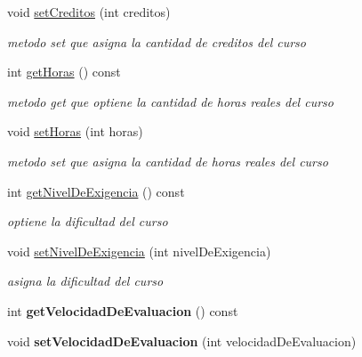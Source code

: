 \begin{DoxyCompactItemize}
void \hyperlink{classCursos_a2956a50ad53e77dc4fcb8c3190d8d071}{set\+Creditos} (int creditos)
\begin{DoxyCompactList}\small\item\em metodo set que asigna la cantidad de creditos del curso \end{DoxyCompactList}\item 
\mbox{\label{classCursos_aa4cdfed1f2684de2e761548d1210e281}} 
int \hyperlink{classCursos_aa4cdfed1f2684de2e761548d1210e281}{get\+Horas} () const
\begin{DoxyCompactList}\small\item\em metodo get que optiene la cantidad de horas reales del curso \end{DoxyCompactList}\item 
\mbox{\label{classCursos_a1c4074ee6a82de1459f1fd31aca8afeb}} 
void \hyperlink{classCursos_a1c4074ee6a82de1459f1fd31aca8afeb}{set\+Horas} (int horas)
\begin{DoxyCompactList}\small\item\em metodo set que asigna la cantidad de horas reales del curso \end{DoxyCompactList}\item 
int \hyperlink{classCursos_af0bb720b647b2ddb8cc1d270d470de92}{get\+Nivel\+De\+Exigencia} () const
\begin{DoxyCompactList}\small\item\em optiene la dificultad del curso \end{DoxyCompactList}\item 
void \hyperlink{classCursos_a8ec40cc7f7ea65b4f8e5f4333ad9ab75}{set\+Nivel\+De\+Exigencia} (int nivel\+De\+Exigencia)
\begin{DoxyCompactList}\small\item\em asigna la dificultad del curso \end{DoxyCompactList}\item 
\mbox{\label{classCursos_a114949cba6ac8c8d592e15454719e264}} 
int {\bfseries get\+Velocidad\+De\+Evaluacion} () const
\item 
\mbox{\label{classCursos_a73033aca49affd0e2272810569cc3c5e}} 
void {\bfseries set\+Velocidad\+De\+Evaluacion} (int velocidad\+De\+Evaluacion)
\item 
\mbox{\label{classCursos_acce476ec81302d25e7336717603faf42}} 

\end{DoxyCompactItemize}
